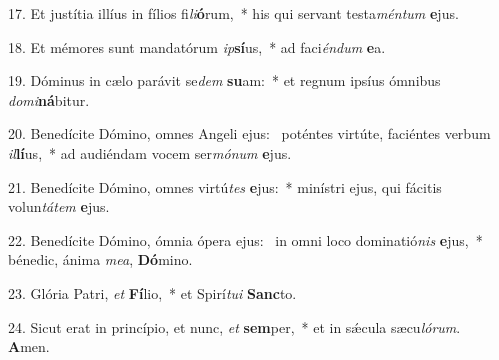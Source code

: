 17. Et justítia illíus in fílios fi\textit{li}\textbf{ó}rum,~*  his qui servant testa\textit{mén}\textit{tum} \textbf{e}jus.\

18. Et mémores sunt mandatórum \textit{ip}\textbf{sí}us,~*  ad faci\textit{én}\textit{dum} \textbf{e}a.\

19. Dóminus in cælo parávit se\textit{dem} \textbf{su}am:~*  et regnum ipsíus ómnibus \textit{do}\textit{mi}\textbf{ná}bitur.\

20. Benedícite Dómino, omnes Angeli ejus: \dag\  poténtes virtúte, faciéntes verbum \textit{il}\textbf{lí}us,~*  ad audiéndam vocem ser\textit{mó}\textit{num} \textbf{e}jus.\

21. Benedícite Dómino, omnes virtú\textit{tes} \textbf{e}jus:~*  minístri ejus, qui fácitis volun\textit{tá}\textit{tem} \textbf{e}jus.\

22. Benedícite Dómino, ómnia ópera ejus: \dag\  in omni loco dominatió\textit{nis} \textbf{e}jus,~*  bénedic, ánima \textit{me}\textit{a}, \textbf{Dó}mino.\

23. Glória Patri, \textit{et} \textbf{Fí}lio,~*  et Spirí\textit{tu}\textit{i} \textbf{Sanc}to.\

24. Sicut erat in princípio, et nunc, \textit{et} \textbf{sem}per,~*  et in sǽcula sæcu\textit{ló}\textit{rum}. \textbf{A}men.\

